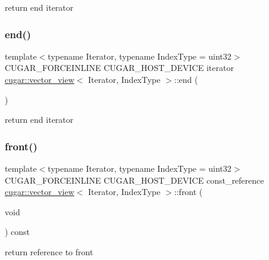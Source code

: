return end iterator \mbox{\label{structcugar_1_1vector__view_a3d34bf66c1ee2cb7dccf53b7dc58e2a2}} 
\subsubsection{\texorpdfstring{end()}{end()}\hspace{0.1cm}{\footnotesize\ttfamily [2/2]}}
{\footnotesize\ttfamily template$<$typename Iterator, typename Index\+Type = uint32$>$ \\
C\+U\+G\+A\+R\+\_\+\+F\+O\+R\+C\+E\+I\+N\+L\+I\+NE C\+U\+G\+A\+R\+\_\+\+H\+O\+S\+T\+\_\+\+D\+E\+V\+I\+CE iterator \hyperlink{structcugar_1_1vector__view}{cugar\+::vector\+\_\+view}$<$ Iterator, Index\+Type $>$\+::end (\begin{DoxyParamCaption}{ }\end{DoxyParamCaption})\hspace{0.3cm}{\ttfamily [inline]}}

return end iterator \mbox{\label{structcugar_1_1vector__view_a011678a732fc8f46d65b65b1cb4ed466}} 
\subsubsection{\texorpdfstring{front()}{front()}\hspace{0.1cm}{\footnotesize\ttfamily [1/2]}}
{\footnotesize\ttfamily template$<$typename Iterator, typename Index\+Type = uint32$>$ \\
C\+U\+G\+A\+R\+\_\+\+F\+O\+R\+C\+E\+I\+N\+L\+I\+NE C\+U\+G\+A\+R\+\_\+\+H\+O\+S\+T\+\_\+\+D\+E\+V\+I\+CE const\+\_\+reference \hyperlink{structcugar_1_1vector__view}{cugar\+::vector\+\_\+view}$<$ Iterator, Index\+Type $>$\+::front (\begin{DoxyParamCaption}\item[{void}]{ }\end{DoxyParamCaption}) const\hspace{0.3cm}{\ttfamily [inline]}}

return reference to front \mbox{\label{structcugar_1_1vector__view_aba41f15593f52d248d7d525c152ba124}} 
